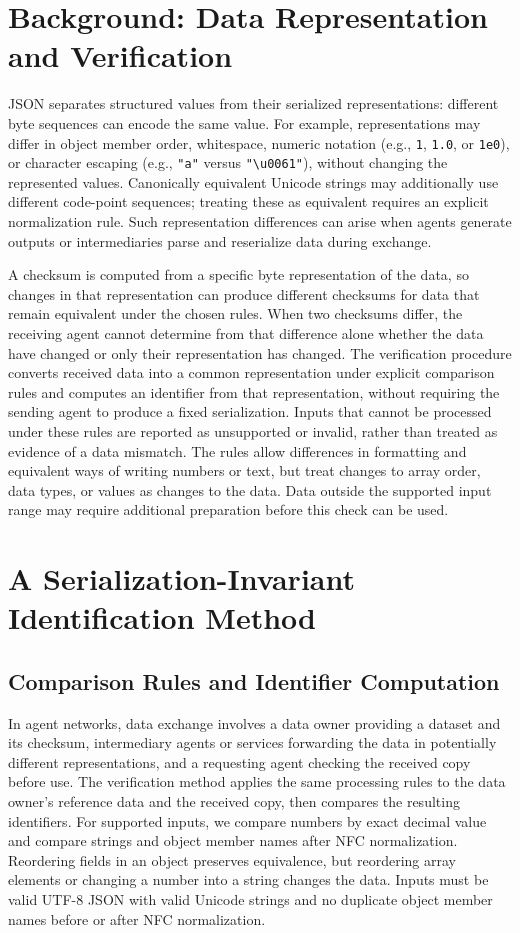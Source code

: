\documentclass[conference]{IEEEtran}
\begin{document}
\section{Background: Data Representation and Verification}
\label{sec:background}
JSON separates structured values from their serialized representations: different byte sequences can encode the same value.
For example, representations may differ in object member order, whitespace, numeric notation (e.g., \texttt{1}, \texttt{1.0}, or \texttt{1e0}), or character escaping (e.g., \texttt{"a"} versus \texttt{"\textbackslash u0061"}), without changing the represented values.
Canonically equivalent Unicode strings may additionally use different code-point sequences; treating these as equivalent requires an explicit normalization rule.
Such representation differences can arise when agents generate outputs or intermediaries parse and reserialize data during exchange.

A checksum is computed from a specific byte representation of the data, so changes in that representation can produce different checksums for data that remain equivalent under the chosen rules.
When two checksums differ, the receiving agent cannot determine from that difference alone whether the data have changed or only their representation has changed.
The verification procedure converts received data into a common representation under explicit comparison rules and computes an identifier from that representation, without requiring the sending agent to produce a fixed serialization.
Inputs that cannot be processed under these rules are reported as unsupported or invalid, rather than treated as evidence of a data mismatch.
The rules allow differences in formatting and equivalent ways of writing numbers or text, but treat changes to array order, data types, or values as changes to the data.
Data outside the supported input range may require additional preparation before this check can be used.

\section{A Serialization-Invariant Identification Method}
\label{sec:identifier}
\subsection{Comparison Rules and Identifier Computation}
In agent networks, data exchange involves a data owner providing a dataset and its checksum, intermediary agents or services forwarding the data in potentially different representations, and a requesting agent checking the received copy before use.
The verification method applies the same processing rules to the data owner's reference data and the received copy, then compares the resulting identifiers.
For supported inputs, we compare numbers by exact decimal value and compare strings and object member names after NFC normalization.
Reordering fields in an object preserves equivalence, but reordering array elements or changing a number into a string changes the data.
Inputs must be valid UTF-8 JSON with valid Unicode strings and no duplicate object member names before or after NFC normalization.
\end{document}
